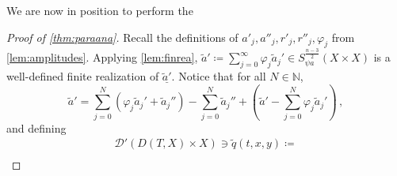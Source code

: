 \documentclass[
	fontsize=11pt, 
	twoside=false, 
	abstract=true, 
	a4paper,
]{scrartcl}
\newcommand{\RR}{\mathbb{R}}
\newcommand{\norm}[1]{\left\lVert#1\right\rVert}
\newcommand{\abs}[1]{\left\lvert#1\right\rvert}
\newcommand{\del}{\partial}
\newcommand{\td}[1]{\tilde{#1}}
\newcommand{\ud}[1]{\underline{#1}}
\begin{document}
We are now in position to perform the
\begin{proof}[Proof of \cref{thm:paraana}]
	Recall the definitions of $a'_j,a''_j, r'_j,r''_j,\varphi_j$ from \cref{lem:amplitudes}. 
	Applying \cref{lem:finrea}, %
	$\td{a}' \coloneqq \sum_{j=0}^\infty \varphi_j\td{a}_j' \in S^{\frac{n-3}{2}}_{\psi a}(X\times X)$ is a well-defined finite realization of $\ud{\td{a}'}$. %
%
	Notice that for all $N\in\mathbb{N}$,
	\[
		\td{a}' = \sum_{j=0}^N (\varphi_j\td{a}_j'+\td{a}_j'') - \sum_{j=0}^N\td{a}_j'' + \left(\td{a}' - \sum_{j=0}^N \varphi_j\td{a}_j'\right)\,,%
	\]
%		
%
	and defining
	\begin{gather}
		\mathcal{D}'(D(T,X)\times X)\ni \td{q}(t,x,y)\coloneqq \label{eq:tdaexpand2}\\

\end{gather}
\end{proof}
\end{document}
